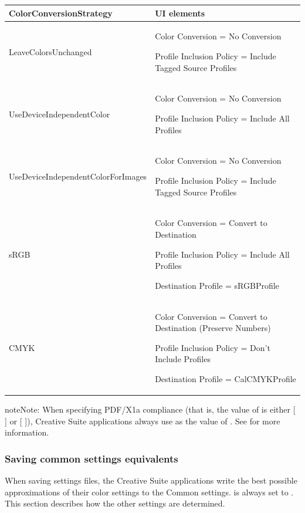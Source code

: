 \documentclass[letterpaper,12pt,english,openany,oneside]{sphinxmanual}
\begin{document}
\begin{savenotes}\sphinxattablestart
\centering
{}\label{\detokenize{PDF_Create_UsingSettings:section-5}}\nobreak
\begin{tabulary}{\linewidth}[t]{|T|T|}
\hline
\sphinxstyletheadfamily 
ColorConversionStrategy
&\sphinxstyletheadfamily 
UI elements
\\
\hline
LeaveColorsUnchanged
&
Color Conversion = No Conversion

Profile Inclusion Policy = Include Tagged Source Profiles
\\
\hline
UseDeviceIndependentColor
&
Color Conversion = No Conversion

Profile Inclusion Policy = Include All Profiles
\\
\hline
UseDeviceIndependentColorForImages
&
Color Conversion = No Conversion

Profile Inclusion Policy = Include Tagged Source Profiles
\\
\hline
sRGB
&
Color Conversion = Convert to Destination

Profile Inclusion Policy = Include All Profiles

Destination Profile = sRGBProfile
\\
\hline
CMYK
&
Color Conversion = Convert to Destination (Preserve Numbers)

Profile Inclusion Policy = Don’t Include Profiles

Destination Profile = CalCMYKProfile
\\
\hline
\end{tabulary}
\par
\sphinxattableend\end{savenotes}

\begin{sphinxadmonition}{note}{Note:}
When specifying PDF/X\sphinxhyphen{}1a compliance (that is, the value of  is either {[} {]} or {[} {]}), Creative Suite applications always use  as the value of  . See  for more information.
\end{sphinxadmonition}


\subsubsection{Saving common settings equivalents}
\label{\detokenize{PDF_Create_UsingSettings:saving-common-settings-equivalents}}
When saving settings files, the Creative Suite applications write the best possible approximations of their color settings to the Common settings.  is always set to \sphinxcode{\sphinxupquote{()}} . This section describes how the other settings are determined.
\end{document}
